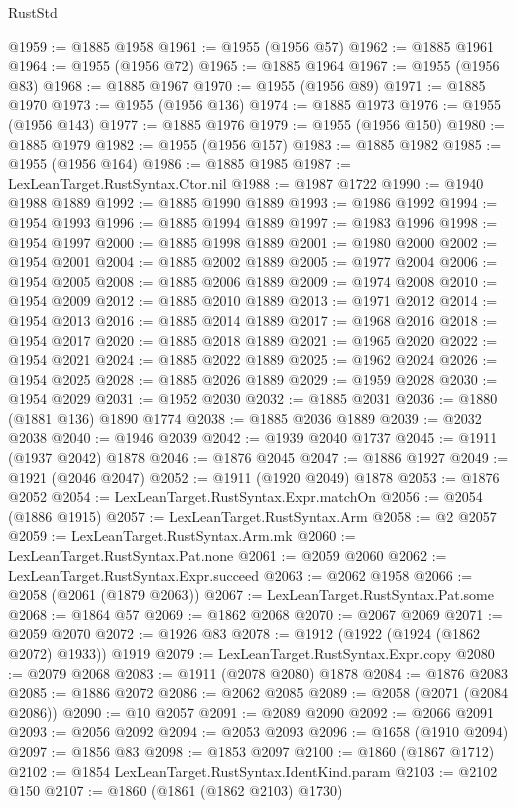\begin{lexlean}{RustStd}
\begin{coremodule}
@1959 := @1885 @1958
@1961 := @1955 (@1956 @57)
@1962 := @1885 @1961
@1964 := @1955 (@1956 @72)
@1965 := @1885 @1964
@1967 := @1955 (@1956 @83)
@1968 := @1885 @1967
@1970 := @1955 (@1956 @89)
@1971 := @1885 @1970
@1973 := @1955 (@1956 @136)
@1974 := @1885 @1973
@1976 := @1955 (@1956 @143)
@1977 := @1885 @1976
@1979 := @1955 (@1956 @150)
@1980 := @1885 @1979
@1982 := @1955 (@1956 @157)
@1983 := @1885 @1982
@1985 := @1955 (@1956 @164)
@1986 := @1885 @1985
@1987 := LexLeanTarget.RustSyntax.Ctor.nil
@1988 := @1987 @1722
@1990 := @1940 @1988 @1889
@1992 := @1885 @1990 @1889
@1993 := @1986 @1992
@1994 := @1954 @1993
@1996 := @1885 @1994 @1889
@1997 := @1983 @1996
@1998 := @1954 @1997
@2000 := @1885 @1998 @1889
@2001 := @1980 @2000
@2002 := @1954 @2001
@2004 := @1885 @2002 @1889
@2005 := @1977 @2004
@2006 := @1954 @2005
@2008 := @1885 @2006 @1889
@2009 := @1974 @2008
@2010 := @1954 @2009
@2012 := @1885 @2010 @1889
@2013 := @1971 @2012
@2014 := @1954 @2013
@2016 := @1885 @2014 @1889
@2017 := @1968 @2016
@2018 := @1954 @2017
@2020 := @1885 @2018 @1889
@2021 := @1965 @2020
@2022 := @1954 @2021
@2024 := @1885 @2022 @1889
@2025 := @1962 @2024
@2026 := @1954 @2025
@2028 := @1885 @2026 @1889
@2029 := @1959 @2028
@2030 := @1954 @2029
@2031 := @1952 @2030
@2032 := @1885 @2031
@2036 := @1880 (@1881 @136) @1890 @1774
@2038 := @1885 @2036 @1889
@2039 := @2032 @2038
@2040 := @1946 @2039
@2042 := @1939 @2040 @1737
@2045 := @1911 (@1937 @2042) @1878
@2046 := @1876 @2045
@2047 := @1886 @1927
@2049 := @1921 (@2046 @2047)
@2052 := @1911 (@1920 @2049) @1878
@2053 := @1876 @2052
@2054 := LexLeanTarget.RustSyntax.Expr.matchOn
@2056 := @2054 (@1886 @1915)
@2057 := LexLeanTarget.RustSyntax.Arm
@2058 := @2 @2057
@2059 := LexLeanTarget.RustSyntax.Arm.mk
@2060 := LexLeanTarget.RustSyntax.Pat.none
@2061 := @2059 @2060
@2062 := LexLeanTarget.RustSyntax.Expr.succeed
@2063 := @2062 @1958
@2066 := @2058 (@2061 (@1879 @2063))
@2067 := LexLeanTarget.RustSyntax.Pat.some
@2068 := @1864 @57
@2069 := @1862 @2068
@2070 := @2067 @2069
@2071 := @2059 @2070
@2072 := @1926 @83
@2078 := @1912 (@1922 (@1924 (@1862 @2072) @1933)) @1919
@2079 := LexLeanTarget.RustSyntax.Expr.copy
@2080 := @2079 @2068
@2083 := @1911 (@2078 @2080) @1878
@2084 := @1876 @2083
@2085 := @1886 @2072
@2086 := @2062 @2085
@2089 := @2058 (@2071 (@2084 @2086))
@2090 := @10 @2057
@2091 := @2089 @2090
@2092 := @2066 @2091
@2093 := @2056 @2092
@2094 := @2053 @2093
@2096 := @1658 (@1910 @2094)
@2097 := @1856 @83
@2098 := @1853 @2097
@2100 := @1860 (@1867 @1712)
@2102 := @1854 LexLeanTarget.RustSyntax.IdentKind.param
@2103 := @2102 @150
@2107 := @1860 (@1861 (@1862 @2103) @1730)

\end{coremodule}
\end{lexlean}

